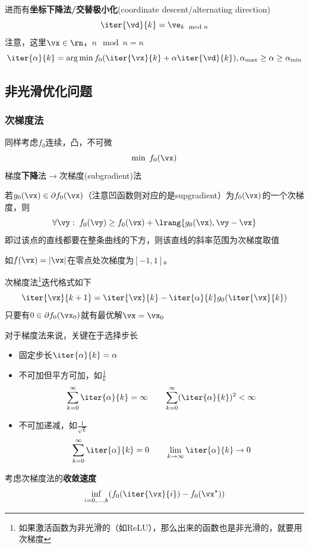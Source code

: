 进而有\textbf{坐标下降法/交替极小化}(coordinate descent/alternating direction)
\[\iter{\vd}{k}=\ve_{k \mod n}\]
注意，这里$\vx\in\rn$，$n \mod n = n$
\[\iter{\alpha}{k}=\arg\min f_0(\iter{\vx}{k}+\alpha\iter{\vd}{k}),\alpha_{\max}\geq \alpha\geq \alpha_{\min}\]


\subsection{非光滑优化问题}
\subsubsection{次梯度法}
同样考虑$f_0$连续，凸，不可微
\[\min\;f_0(\vx)\]
梯度\textbf{下降}法$\to$次梯度(subgradient)法
\begin{definition}[次梯度]
若$g_0(\vx)\in\partial f_0(\vx)$（注意凹函数则对应的是supgradient）为$f_0(\vx)$的一个次梯度，则
\[\forall \vy:\;f_0(\vy)\geq f_0(\vx)+\lrang{g_0(\vx),\vy-\vx}\]
即过该点的直线都要在整条曲线的下方，则该直线的斜率范围为次梯度取值
\end{definition}
如$f(\vx)=|\vx|$在零点处次梯度为$[-1,1]$。

次梯度法\footnote{如果激活函数为非光滑的（如ReLU），那么出来的函数也是非光滑的，就要用次梯度}迭代格式如下
\[\iter{\vx}{k+1}=\iter{\vx}{k}-\iter{\alpha}{k}g_0(\iter{\vx}{k})\]
只要有$0\in\partial f_0(\vx_0)$就有最优解$\vx=\vx_0$

对于梯度法来说，关键在于选择步长
\begin{itemize}
    \item 固定步长$\iter{\alpha}{k}=\alpha$
    \item 不可加但平方可加，如$\frac{1}{k}$
    \[\sum_{k=0}^\infty \iter{\alpha}{k}=\infty\qquad\sum_{k=0}^\infty(\iter{\alpha}{k})^2<\infty\]
    \item 不可加递减，如$\frac{1}{\sqrt{k}}$
    \[\sum_{k=0}^\infty\iter{\alpha}{k}=0\qquad\lim_{k\to\infty}\iter{\alpha}{k}\to 0\]
\end{itemize}

考虑次梯度法的\textbf{收敛速度}
\[\inf_{i=0,\ldots,k}(f_0(\iter{\vx}{i})-f_0(\vx^\star))\]


